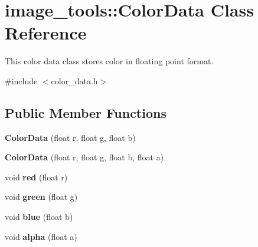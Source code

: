 \hypertarget{classimage__tools_1_1ColorData}{}\section{image\+\_\+tools\+:\+:Color\+Data Class Reference}
\label{classimage__tools_1_1ColorData}


This color data class stores color in floating point format.  




{\ttfamily \#include $<$color\+\_\+data.\+h$>$}

\subsection*{Public Member Functions}
\begin{DoxyCompactItemize}
\item 
{\bfseries Color\+Data} (float r, float g, float b)\hypertarget{classimage__tools_1_1ColorData_ad64a66f681d0e502c2416e0bfcb86d14}{}\label{classimage__tools_1_1ColorData_ad64a66f681d0e502c2416e0bfcb86d14}

\item 
{\bfseries Color\+Data} (float r, float g, float b, float a)\hypertarget{classimage__tools_1_1ColorData_a20782ba5f82e73e731b87311da1bcd56}{}\label{classimage__tools_1_1ColorData_a20782ba5f82e73e731b87311da1bcd56}

\item 
void {\bfseries red} (float r)\hypertarget{classimage__tools_1_1ColorData_a36d30e0a43563d120ec3533b878a7558}{}\label{classimage__tools_1_1ColorData_a36d30e0a43563d120ec3533b878a7558}

\item 
void {\bfseries green} (float g)\hypertarget{classimage__tools_1_1ColorData_aaea99320f199dbdb36b87c82b8b5697d}{}\label{classimage__tools_1_1ColorData_aaea99320f199dbdb36b87c82b8b5697d}

\item 
void {\bfseries blue} (float b)\hypertarget{classimage__tools_1_1ColorData_ab9a4b4f7d983967c1c4105f9df1a60a8}{}\label{classimage__tools_1_1ColorData_ab9a4b4f7d983967c1c4105f9df1a60a8}

\item 
void {\bfseries alpha} (float a)\hypertarget{classimage__tools_1_1ColorData_ad71793a20e4b2f654379ee79938b5ed2}{}\label{classimage__tools_1_1ColorData_ad71793a20e4b2f654379ee79938b5ed2}


\end{DoxyCompactItemize}

